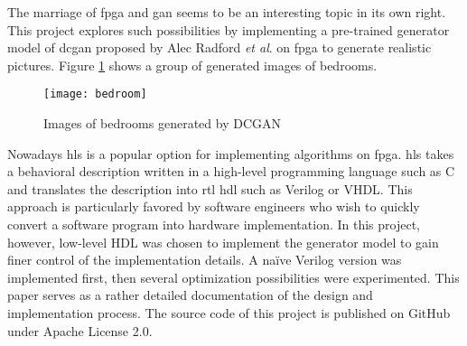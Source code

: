 The marriage of \gls{fpga} and \gls{gan} seems to be an interesting topic in its own right. This project
explores such possibilities by implementing a pre-trained generator model of \gls{dcgan} proposed by
Alec Radford \textit{et al}. \cite{radford:conv_gan} on \gls{fpga} to generate realistic pictures.
Figure \ref{fig:bedroom} shows a group of generated images of bedrooms.

\begin{figure}[h]
  \centering
  \texttt{[image: bedroom]}
  \caption{Images of bedrooms generated by DCGAN \cite{radford:conv_gan}}
  \label{fig:bedroom}
\end{figure}

Nowadays \gls{hls} is a popular option for implementing algorithms on \gls{fpga}. \gls{hls} takes a
behavioral description written in a high-level programming language such as C and translates the description
into \gls{rtl} \gls{hdl} such as Verilog or VHDL. This approach is particularly favored by software
engineers who wish to quickly convert a software program into hardware implementation. In this project,
however, low-level HDL was chosen to implement the generator model to gain finer control of the implementation
details. A naïve Verilog version was implemented first, then several optimization possibilities were
experimented. This paper serves as a rather detailed documentation of the design and implementation process.
The source code of this project is published on GitHub \cite{github:dcgan_fpga} under Apache License 2.0.

\clearpage %
